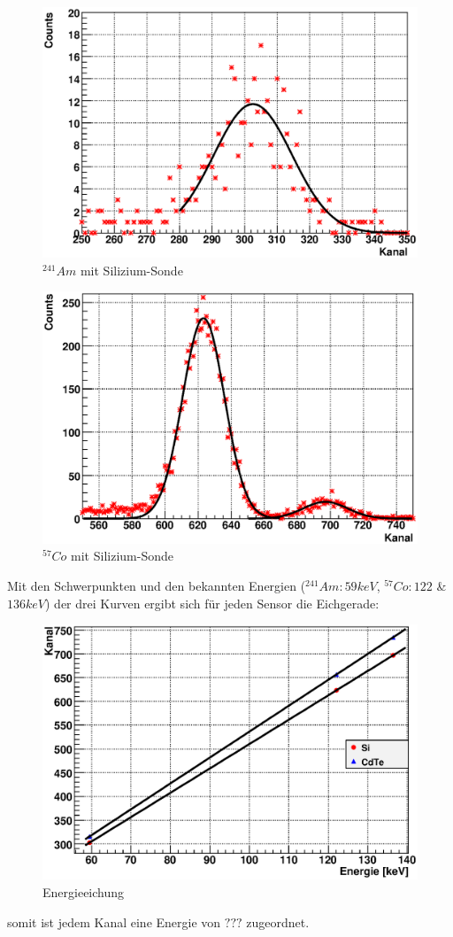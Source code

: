 \documentclass[12pt]{article}
\begin{document}
\begin{figure}[H]
\centering
\includegraphics[width=0.9\linewidth]{../plot/eps/gamma/si_am.eps}
\caption{$^{241}Am$ mit Silizium-Sonde}
\end{figure}

\begin{figure}[H]
\centering
\includegraphics[width=0.9\linewidth]{../plot/eps/gamma/si_co.eps}
\caption{$^{57}Co$ mit Silizium-Sonde}
\end{figure}

Mit den Schwerpunkten und den bekannten Energien ($^{241}Am:59keV$, $^{57}Co:122$ \& $136keV$) der drei Kurven ergibt sich für jeden Sensor die Eichgerade:
\begin{figure}[H]
\centering
\includegraphics[width=0.9\linewidth]{../plot/eps/gamma/finalfit.eps}
\caption{Energieeichung}
\end{figure}
somit ist jedem Kanal eine Energie von $???$ zugeordnet.
\end{document}
